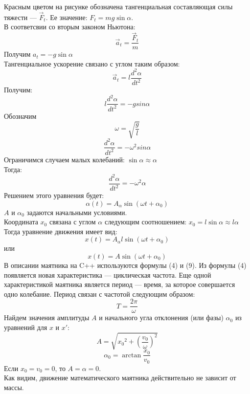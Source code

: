 Красным цветом на рисунке обозначена тангенциальная составляющая силы тяжести --- $\vec F_t$. Ее значение: $F_t = mg\sin\alpha$.\\
В соответсвии со вторым законом Ньютона: 
\begin{equation}
\vec a_t = \frac{\vec F_t} {m} 
\end{equation}
Получим $a_t = -g\sin\alpha$\\
Тангенциальное ускорение связано с углом таким образом:
\begin{equation}
\vec a_t = l\frac{d^2\alpha}{dt^2}
\end{equation}
Получим:
\begin{equation}
 l\frac{d^2\alpha}{dt^2} = -gsin\alpha
\end{equation}
Обозначим \begin{equation}\omega = \sqrt{\frac{g}{l}} \end{equation}
\begin{equation}
\frac{d^2\alpha}{dt^2} = -\omega^2sin\alpha
\end{equation}
Ограничимся случаем малых колебаний: $\sin\alpha \approx \alpha$ \\
Тогда:
\begin{equation}
\frac{d^2\alpha}{dt^2} = -\omega^2\alpha
\end{equation}
Решением этого уравнения будет:
\begin{equation}
\alpha(t) = A_\alpha\sin(\omega t + \alpha_0)
\end{equation}
$A$ и $\alpha_0$ задаются начальными условиями.\\
Координата $x_0$ связана с углом $\alpha$ следующим соотношением: $x_0=l\sin\alpha\approx l\alpha$
Тогда уравнение движения имеет вид:
\begin{equation}
x (t) = A_\alpha l\sin(\omega t + \alpha_0)
\end{equation}
или
\begin{equation}
x (t) = A\sin(\omega t + \alpha_0) 
\end{equation}
В описании маятника на C++ используются формулы (4) и (9). Из формулы (4) появляется новая характеристика --- циклическая частота. Еще одной характеристикой маятника является период --- время, за которое совершается одно колебание. Период связан с частотой следующим образом:
\begin{equation}
T = \frac{2\pi}{\omega}
\end{equation}
Найдем значения амплитуды $A$ и начального угла отклонения (или фазы) $\alpha_0$ из уравнений для $x$ и $x'$:
\begin{equation}
A = \sqrt{{x_0}^2 + {(\frac{v_0}{\omega})}^2}
\end{equation}
\begin{equation}
\alpha_0 = \arctan{\frac{x_0}{v_0}}
\end{equation}
Если $x_0 = v_0 = 0$, то $A = \alpha = 0$. \\
Как видим, движение математического маятника действительно не зависит от массы.\\
